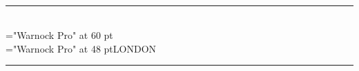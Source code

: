 \documentclass[a4paper,11pt,landscape]{article}
\begin{document}
\pagestyle{empty}
\begin{center}
\mbox{}\\[2.5in]
\hrule\mbox{}
\mbox{}\\[1ex]
\mbox{}
{\font\x="Warnock Pro" at 60 pt\\[0.5cm]}
\mbox{}
{\font\x="Warnock Pro" at 48 pt\x \uppercase{London}\\[0.3cm]}
\hrule

\end{center}
\end{document}
